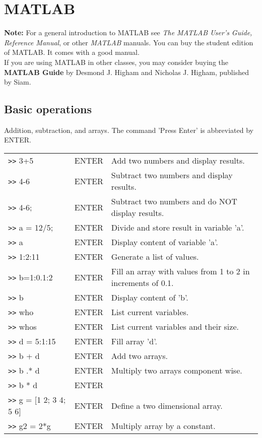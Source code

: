 
\newcommand{\mlc}[1] {\texttt{>> #1 }}
\newcommand{\ttt}[1]{\texttt{#1}}

\section{MATLAB} 

\textbf{Note:} For a general introduction to MATLAB see \textit{The
  MATLAB User's Guide, Reference Manual}, or other \textit{MATLAB}
manuals.  You can buy the student edition of MATLAB.  It comes with a
good manual. \\


If you are using MATLAB in other classes, you may consider buying the 
\textbf{MATLAB Guide} by Desmond J. Higham and Nicholas J. Higham, published
by Siam.\\ 
  

\subsection{Basic operations} Addition, subtraction, and arrays.  The 
command 'Press Enter' is abbreviated by ENTER. \\
\vspace{1in}


\begin{tabular}{lll} 
  \ttt{>>} 3+5     &ENTER   &Add two numbers and display results. \\ 
  \ttt{>>} 4-6     &ENTER   &Subtract two numbers and display results. \\ 
  \ttt{>>} 4-6;    &ENTER   &Subtract two numbers and do NOT
  display results.\\
  \ttt{>>} a = 12/5; &ENTER   &Divide and store result in variable 'a'.\\
  \ttt{>>} a        &ENTER  &Display content of variable 'a'. \\
  \ttt{>>} 1:2:11   &ENTER  &Generate a list of values. \\
  \ttt{>>} b=1:0.1:2 &ENTER & Fill an array with values from 1 to
  2 in increments of 0.1.\\
  \ttt{>>} b          &ENTER & Display content of 'b'. \\
  \ttt{>>} who      &ENTER  &List current variables. \\
  \ttt{>>} whos     &ENTER  &List current variables and their size.\\
  \ttt{>>} d = 5:1:15 &ENTER &Fill array 'd'. \\
  \ttt{>>} b + d     &ENTER &Add two arrays. \\
  \ttt{>>} b .* d    &ENTER & Multiply two arrays component wise. \\
  \ttt{>>} b * d     &ENTER & \\ 
  \ttt{>>} g = [1 2; 3 4; 5 6] &ENTER &Define a two dimensional array. \\
  \ttt{>>} g2 = 2*g  &ENTER & Multiply array by a constant. \\
\end{tabular}

